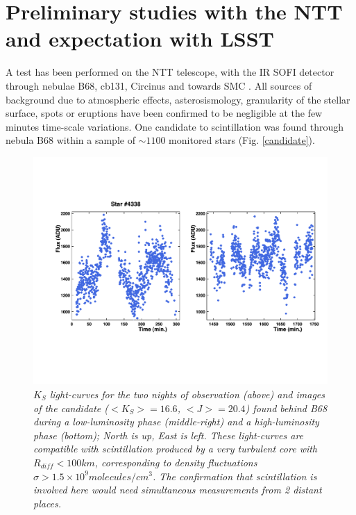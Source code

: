 \documentclass[11pt]{article}
\begin{document}
\section{Preliminary studies with the NTT and expectation with LSST}
A test has been performed on the NTT telescope, with the IR
SOFI detector through nebulae B68, cb131, Circinus and
towards SMC \cite{habibietal}. All sources of
background due to atmospheric effects, asterosismology, granularity of the
stellar surface, spots or eruptions
have been confirmed to be negligible at the few minutes time-scale variations.
One candidate to scintillation was found through nebula B68 within a sample
of $\sim 1100$ monitored stars (Fig. \ref{candidate}).
\begin{figure}[h!]
\parbox{10.cm}{
\includegraphics[width=10.cm]{15260fg11a.pdf}
\caption[]{\it
$K_S$ light-curves for the two nights of observation (above) and images of the
candidate ($<K_S>=16.6$, $<J>=20.4$) found behind B68 during a low-luminosity phase (middle-right)
and a high-luminosity phase (bottom); North is up, East is left.
These light-curves are compatible with scintillation produced by a very turbulent core with
$R_{diff}<100km$, corresponding to density fluctuations $\sigma > 1.5 \times 10^9 molecules/cm^{3}$.
The confirmation that scintillation is involved here would need simultaneous measurements from 2 distant places.
}
}
\hspace{0.3cm}
\parbox{5.7cm}{
}
\end{figure}
\end{document}
